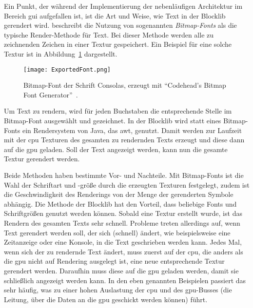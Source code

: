 Ein Punkt, der während der Implementierung der nebenläufigen Architektur im Bereich \ac{gui} aufgefallen ist, ist die Art und Weise, wie Text in der Blocklib gerendert wird. \textcite{Vries2020} beschreibt die Nutzung von sogenannten \emph{Bitmap-Fonts} als die typische Render-Methode für Text. Bei dieser Methode werden alle zu zeichnenden Zeichen in einer Textur gespeichert. Ein Beispiel für eine solche Textur ist in Abbildung~\ref{fig:bitmapfont} dargestellt.
\begin{figure}[!htbp]
	\centering
	\texttt{[image: ExportedFont.png]}
	\caption[Bitmap-Font der Schrift Consolas.]{Bitmap-Font der Schrift Consolas, erzeugt mit \enquote{Codehead's Bitmap Font Generator}~\cite{Codehead2015}.}\label{fig:bitmapfont}
\end{figure}
Um Text zu rendern, wird für jeden Buchstaben die entsprechende Stelle im Bitmap-Font ausgewählt und gezeichnet. In der Blocklib wird statt eines Bitmap-Fonts ein Rendersystem von Java, das \ac{awt}, genutzt. Damit werden zur Laufzeit mit der \ac{cpu} Texturen des gesamten zu rendernden Texts erzeugt und diese dann auf die \ac{gpu} geladen. Soll der Text angezeigt werden, kann nun die gesamte Textur gerendert werden.

Beide Methoden haben bestimmte Vor- und Nachteile. Mit Bitmap-Fonts ist die Wahl der Schriftart und -größe durch die erzeugten Texturen festgelegt, zudem ist die Geschwindigkeit des Renderings von der Menge der gerenderten Symbole abhängig. Die Methode der Blocklib hat den Vorteil, dass beliebige Fonts und Schriftgrößen genutzt werden können. Sobald eine Textur erstellt wurde, ist das Rendern des gesamten Texts sehr schnell. Probleme treten allerdings auf, wenn Text gerendert werden soll, der sich (schnell) ändert, wie beispielsweise eine Zeitanzeige oder eine Konsole, in die Text geschrieben werden kann. Jedes Mal, wenn sich der zu rendernde Text ändert, muss zuerst auf der \ac{cpu}, die anders als die \ac{gpu} nicht auf Rendering ausgelegt ist, eine neue entsprechende Textur gerendert werden. Daraufhin muss diese auf die \ac{gpu} geladen werden, damit sie schließlich angezeigt werden kann. In den eben genannten Beispielen passiert das sehr häufig, was zu einer hohen Auslastung der \ac{cpu} und des \ac{gpu}-Busses (die Leitung, über die Daten an die \ac{gpu} geschickt werden können) führt.

